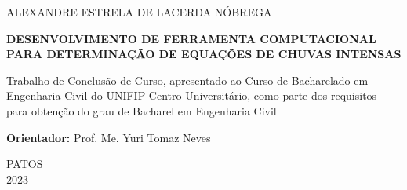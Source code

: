 \thispagestyle{empty}
	
	\begin{center}
		ALEXANDRE ESTRELA DE LACERDA NÓBREGA
	\end{center}
	
	\vspace{3.5cm}
	
	\begin{center}
		{\large \textbf{DESENVOLVIMENTO DE FERRAMENTA COMPUTACIONAL PARA DETERMINAÇÃO DE EQUAÇÕES DE CHUVAS INTENSAS}}
	\end{center}
	
	\vspace{4cm}
	
	\begin{quoting}[rightmargin=0cm,leftmargin=8cm]
 
        \noindent Trabalho de Conclusão de Curso, apresentado ao Curso de Bacharelado em Engenharia Civil do UNIFIP Centro Universitário, como parte dos requisitos para obtenção do grau de Bacharel em Engenharia Civil
		
		\vspace{6pt}
		
		\noindent \textbf{Orientador:} Prof. Me. Yuri Tomaz Neves
		
		\vspace{6pt}
		

	\end{quoting}
	
	\vfill
	
	\begin{center}
		PATOS \\
			2023
	\end{center}
	\newpage
	
